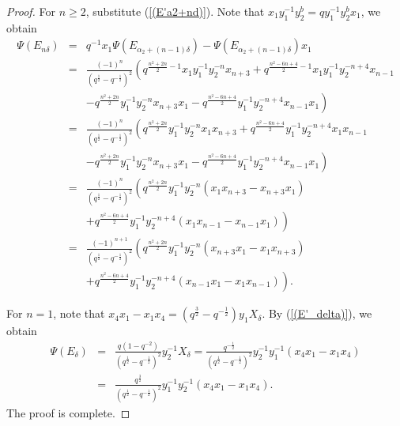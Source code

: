 \documentclass[reqno,11pt]{amsart}
\numberwithin{equation}{section}
\begin{document}
\begin{proof}
For $n \ge 2$, substitute (\ref{(E'a2+nd)}). Note that $x_1 y_1^{-1} y_2^b=q y_1^{-1} y_2^b x_1$, we obtain
\begingroup
{}
\begin{eqnarray*}\Psi\left(E_{n \delta}\right)&=&q^{-1} x_1 \Psi\left(E_{\alpha_2+(n-1) \delta}\right)-\Psi\left(E_{\alpha_2+(n-1) \delta}\right) x_1\\
&	= & \frac{(-1)^n}{\left(q^{\frac{1}{2}}-q^{-\frac{1}{2}}\right)^2}\left(q^{\frac{n^2+2 n}{2}-1} x_1 y_1^{-1} y_2^{-n} x_{n+3}+q^{\frac{n^2-6 n+4}{2}-1} x_1 y_1^{-1} y_2^{-n+4} x_{n-1}\right. \\
&	& \left.-q^{\frac{n^2+2 n}{2}} y_1^{-1} y_2^{-n} x_{n+3} x_1-q^{\frac{n^2-6 n+4}{2}} y_1^{-1} y_2^{-n+4} x_{n-1} x_1\right) \\
&	= & \frac{(-1)^n}{\left(q^{\frac{1}{2}}-q^{-\frac{1}{2}}\right)^2}\left(q^{\frac{n^2+2 n}{2}} y_1^{-1} y_2^{-n} x_1 x_{n+3}+q^{\frac{n^2-6 n+4}{2}} y_1^{-1} y_2^{-n+4} x_1 x_{n-1}\right. \\
&	& \left.-q^{\frac{n^2+2 n}{2}} y_1^{-1} y_2^{-n} x_{n+3} x_1-q^{\frac{n^2-6 n+4}{2}} y_1^{-1} y_2^{-n+4} x_{n-1} x_1\right) \\
&	= & \frac{(-1)^n}{\left(q^{\frac{1}{2}}-q^{-\frac{1}{2}}\right)^2}\left(q^{\frac{n^2+2 n}{2}} y_1^{-1} y_2^{-n}\left(x_1 x_{n+3}-x_{n+3} x_1\right)\right. \\
&	& \left.+q^{\frac{n^2-6 n+4}{2}} y_1^{-1} y_2^{-n+4}\left(x_1 x_{n-1}-x_{n-1} x_1\right)\right) \\
&	= & \frac{(-1)^{n+1}}{\left(q^{\frac{1}{2}}-q^{-\frac{1}{2}}\right)^2}\left(q^{\frac{n^2+2 n}{2}} y_1^{-1} y_2^{-n}\left(x_{n+3} x_1-x_1 x_{n+3}\right)\right. \\
&	& \left.+q^{\frac{n^2-6 n+4}{2}} y_1^{-1} y_2^{-n+4}\left(x_{n-1} x_1-x_1 x_{n-1}\right)\right) .
\end{eqnarray*}
\endgroup

For $n=1$, note that $x_4 x_1-x_1 x_4 =\left(q^{\frac{3}{2}}-q^{-\frac{1}{2}}\right) y_1 X_\delta$. By (\ref{(E'_delta)}), we obtain
\begin{eqnarray*}
	\Psi\left(E_\delta\right)&= &  \frac{{q\left( {1 - {q^{ - 2}}} \right)}}{{{{\left( {{q^{\frac{1}{2}}} - {q^{ - \frac{1}{2}}}} \right)}^2}}}y_2^{ - 1}{X_\delta } = \frac{{{q^{ - \frac{1}{2}}}}}{{{{\left( {{q^{\frac{1}{2}}} - {q^{ - \frac{1}{2}}}} \right)}^2}}}y_2^{ - 1}y_1^{ - 1}\left( {{x_4}{x_1} - {x_1}{x_4}} \right)\\
&	= &\frac{{{q^{\frac{3}{2}}}}}{{{{\left( {{q^{\frac{1}{2}}} - {q^{ - \frac{1}{2}}}} \right)}^2}}}y_1^{ - 1}y_2^{ - 1}\left( {{x_4}{x_1} - {x_1}{x_4}} \right).
\end{eqnarray*}
The proof is complete.
\end{proof}
\end{document}
